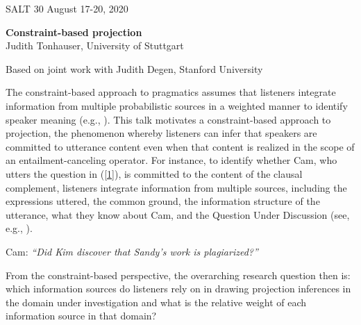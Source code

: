 \documentclass[12pt,fleqn]{article}
\newcommand{\6}{\mbox{$[\hspace*{-.6mm}[$}}
\newcommand{\9}{\mbox{$]\hspace*{-.6mm}]$}}
\begin{document}
 
SALT 30 \hfill August 17-20, 2020
  
\begin{center}
{\bf Constraint-based projection}
\\ Judith Tonhauser, University of Stuttgart
\end{center}

\vspace*{.5cm}

\noindent
Based on joint work with Judith Degen, Stanford University

\vspace*{.5cm}
\noindent
The constraint-based approach to pragmatics assumes that listeners integrate information from multiple probabilistic sources in a weighted manner to identify speaker meaning (e.g., \citealt{degen-tanenhaus2019}). This talk motivates a constraint-based approach to projection, the phenomenon whereby listeners can infer that speakers are committed to utterance content even when that content is realized in the scope of an entailment-canceling operator. For instance, to identify whether Cam, who utters the question in (\ref{1}), is committed to the content of the clausal complement, listeners integrate information from multiple sources, including the expressions uttered, the common ground, the information structure of the utterance, what they know about Cam, and the Question Under Discussion (see, e.g., \citealt{beaver-belly,brst-ar,cummins-rohde2015,djaerv-bacovcin-salt27,mahler2020,brst-salt10,best-question,tonhauser-salt26,tonhauser-guarani-variability,tbd-variability,tonhauser-etal-sub23}).

\begin{exe}
\ex\label{1} Cam: {\em ``Did Kim discover that Sandy's work is plagiarized?''}
\end{exe}

From the constraint-based perspective, the overarching research question then is: which information sources do listeners rely on in drawing projection inferences in the domain under investigation and what is the relative weight of each information source in that domain?
\end{document}
